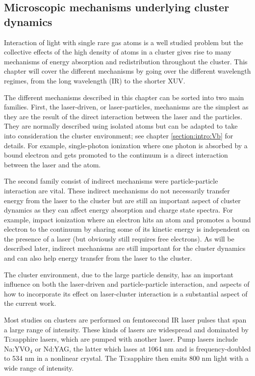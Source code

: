 \subsection{Microscopic mechanisms underlying cluster dynamics}
\label{section:intro:mechanisms}

Interaction of light with single rare gas atoms is a well studied problem but
the collective effects of the high density of atoms in a cluster gives rise to
many mechanisms of energy absorption and redistribution throughout the
cluster. This chapter will cover the different mechanisms by going over the
different wavelength regimes, from the long wavelength (IR) to the shorter XUV.

The different mechanisms described in this chapter can be sorted into two main
families. First, the laser-driven, or laser-particles, mechanisms are the
simplest as they are the result of the direct interaction between the laser
and the particles. They are normally described using isolated atoms but can
be adapted to take into consideration the cluster environment; see chapter
\ref{section:intro:Vb} for details. For example, single-photon ionization where
one photon is absorbed by a bound electron and gets promoted to the continuum is
a direct interaction between the laser and the atom.

The second family consist of indirect mechanisms were particle-particle
interaction are vital. These indirect mechanisms do not necessarily transfer
energy from the laser to the cluster but are still an important aspect of
cluster dynamics as they can affect energy absorption and charge state spectra.
For example, impact ionization where
an electron hits an atom and promotes a bound electron to the continuum by
sharing some of its kinetic energy is independent on the presence of a laser
(but obviously still requires free electrons). As will be described later,
indirect mechanisms are still important for the cluster dynamics and can also
help energy transfer from the laser to the cluster.

The cluster environment, due to the large particle density, has an important
influence on both the laser-driven and particle-particle interaction, and
aspects of how to incorporate its effect on laser-cluster interaction
is a substantial aspect of the current work.

Most studies on clusters are performed on femtosecond IR laser
pulses that span a large range of intensity. These kinds of lasers are
widespread and dominated by Ti:sapphire lasers, which are pumped with another laser.
Pump lasers include Na:YVO$_4$ or Nd:YAG, the latter which lases at 1064 nm and is
frequency-doubled to 534 nm in a nonlinear crystal. The Ti:sapphire then emits
800 nm light with a wide range of intensity.

